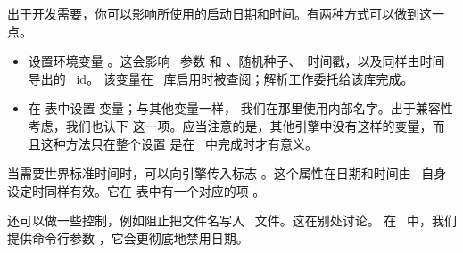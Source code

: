 出于开发需要，你可以影响所使用的启动日期和时间。有两种方式可以做到这一点。

\begin{itemize}

\item 设置环境变量 。这会影响 \TEX\ 参数  和
    、随机种子、\PDF\ 时间戳，以及同样由时间导出的 \PDF\ id。
    该变量在 \KPSE\ 库启用时被查阅；解析工作委托给该库完成。

\item 在  表中设置  变量；与其他变量一样，
    我们在那里使用内部名字。出于兼容性考虑，我们也认下 
    这一项。应当注意的是，其他引擎中没有这样的变量，而且这种方法只在整个设置
    是在 \LUA\ 中完成时才有意义。

\end{itemize}

当需要世界标准时间时，可以向引擎传入标志 。这个属性在日期和时间由
\LUATEX\ 自身设定时同样有效。它在  表中有一个对应的项
。

还可以做一些控制，例如阻止把文件名写入 \PDF\ 文件。这在别处讨论。
在 \CONTEXT\ 中，我们提供命令行参数 ，它会更彻底地禁用日期。
